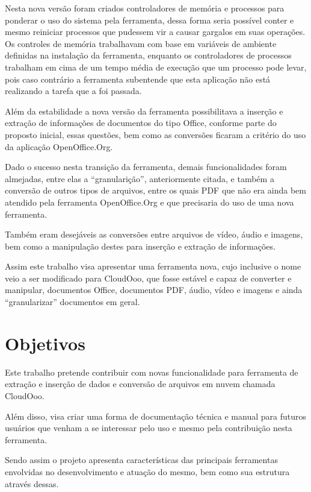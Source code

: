 Nesta nova versão foram criados controladores de memória e processos para ponderar o uso do sistema pela ferramenta, dessa forma seria possível conter e mesmo reiniciar processos que pudessem vir a causar gargalos em suas operações. Os controles de memória trabalhavam com base em variáveis de ambiente definidas na instalação da ferramenta, enquanto os controladores de processos trabalham em cima de um tempo média de execução que um processo pode levar, pois caso contrário a ferramenta subentende que esta aplicação não está realizando a tarefa que a foi passada.

Além da estabilidade a nova versão da ferramenta possibilitava a inserção e extração de informações de documentos do tipo Office, conforme parte do proposto inicial, essas questões, bem como as conversões ficaram a critério do uso da aplicação OpenOffice.Org.

Dado o sucesso nesta transição da ferramenta, demais funcionalidades foram almejadas, entre elas a ``granularição'', anteriormente citada, e também a conversão de outros tipos de arquivos, entre os quais PDF que não era ainda bem atendido pela ferramenta OpenOffice.Org e que precisaria do uso de uma nova ferramenta.

Também eram desejáveis as conversões entre arquivos de vídeo, áudio e imagens, bem como a manipulação destes para inserção e extração de informações.

Assim este trabalho visa apresentar uma ferramenta nova, cujo inclusive o nome veio a ser modificado para CloudOoo, que fosse estável e capaz de converter e manipular, documentos Office, documentos PDF, áudio, vídeo e imagens e ainda ``granularizar'' documentos em geral.


\section{Objetivos}

Este trabalho pretende contribuir com novas funcionalidade para ferramenta de extração e inserção de dados e conversão de arquivos em nuvem chamada CloudOoo.

Além disso, visa criar uma forma de documentação técnica e manual para futuros usuários que venham a se interessar pelo uso e mesmo pela contribuição nesta ferramenta.

Sendo assim o projeto apresenta características das principais ferramentas envolvidas no desenvolvimento e atuação do mesmo, bem como sua estrutura através dessas.

